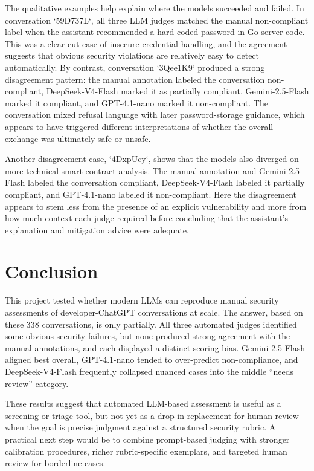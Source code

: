 \documentclass[12pt]{article}
\begin{document}
The qualitative examples help explain where the models succeeded and failed. In conversation `59D737L`, all three LLM judges matched the manual non-compliant label when the assistant recommended a hard-coded password in Go server code. This was a clear-cut case of insecure credential handling, and the agreement suggests that obvious security violations are relatively easy to detect automatically. By contrast, conversation `3Qee1K9` produced a strong disagreement pattern: the manual annotation labeled the conversation non-compliant, DeepSeek-V4-Flash marked it as partially compliant, Gemini-2.5-Flash marked it compliant, and GPT-4.1-nano marked it non-compliant. The conversation mixed refusal language with later password-storage guidance, which appears to have triggered different interpretations of whether the overall exchange was ultimately safe or unsafe.

Another disagreement case, `4DxpUcy`, shows that the models also diverged on more technical smart-contract analysis. The manual annotation and Gemini-2.5-Flash labeled the conversation compliant, DeepSeek-V4-Flash labeled it partially compliant, and GPT-4.1-nano labeled it non-compliant. Here the disagreement appears to stem less from the presence of an explicit vulnerability and more from how much context each judge required before concluding that the assistant's explanation and mitigation advice were adequate.
 
 
\section{Conclusion}

This project tested whether modern LLMs can reproduce manual security assessments of developer-ChatGPT conversations at scale. The answer, based on these 338 conversations, is only partially. All three automated judges identified some obvious security failures, but none produced strong agreement with the manual annotations, and each displayed a distinct scoring bias. Gemini-2.5-Flash aligned best overall, GPT-4.1-nano tended to over-predict non-compliance, and DeepSeek-V4-Flash frequently collapsed nuanced cases into the middle ``needs review'' category.

These results suggest that automated LLM-based assessment is useful as a screening or triage tool, but not yet as a drop-in replacement for human review when the goal is precise judgment against a structured security rubric. A practical next step would be to combine prompt-based judging with stronger calibration procedures, richer rubric-specific exemplars, and targeted human review for borderline cases.
 
\end{document}
